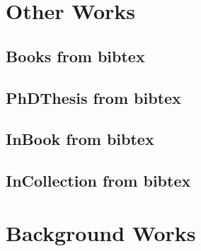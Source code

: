 \documentclass[a4paper]{article}
\begin{document}


\clearpage
\section{Other Works}

\clearpage
\subsection{Books from bibtex}


\clearpage
\subsection{PhDThesis from bibtex}


\clearpage



\clearpage
\subsection{InBook from bibtex}


\clearpage
\subsection{InCollection from bibtex}


\clearpage


\clearpage
\section{Background Works}



\end{document}
